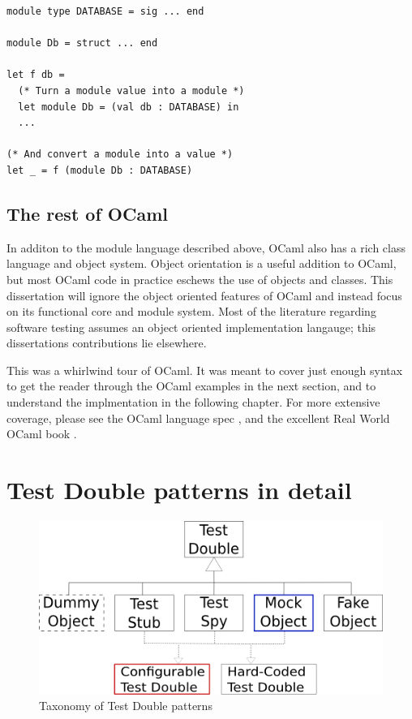 \begin{lstlisting}
module type DATABASE = sig ... end

module Db = struct ... end

let f db =
  (* Turn a module value into a module *)
  let module Db = (val db : DATABASE) in
  ...

(* And convert a module into a value *)
let _ = f (module Db : DATABASE)
\end{lstlisting}

\subsection{The rest of OCaml}


In additon to the module language described above, OCaml also has a
rich class language and object system. Object orientation is a useful
addition to OCaml, but most OCaml code in practice eschews the use of
objects and classes. This dissertation will ignore the object oriented
features of OCaml and instead focus on its functional core and module
system. Most of the literature regarding software testing assumes
an object oriented implementation langauge; this dissertations
contributions lie elsewhere.

This was a whirlwind tour of OCaml. It was meant to cover just enough
syntax to get the reader through the OCaml examples in the next
section, and to understand the implmentation in the following
chapter. For more extensive coverage, please see the OCaml language
spec \cite{ocaml:spec}, and the excellent Real World OCaml book
\cite{rwo}.

\section{Test Double patterns in detail}
\label{testdoubles}


\begin{figure}
  \centering
  \includegraphics[scale=0.7]{img/test_double_taxonomy.png}
  \caption[Taxonomy of Test Double patterns]{Taxonomy of Test Double patterns\footnotemark}
  \label{fig:taxonomy}
\end{figure}

